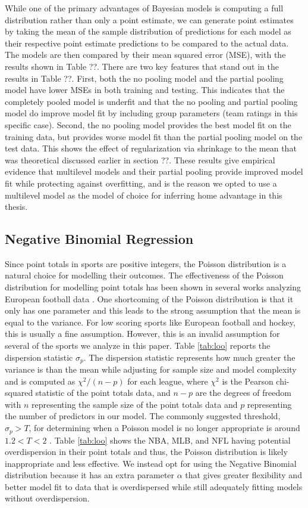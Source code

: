 While one of the primary advantages of Bayesian models is computing a full distribution rather than only a point estimate, we can generate point estimates by taking the mean of the sample distribution of predictions for each model as their respective point estimate predictions to be compared to the actual data. The models are then compared by their mean squared error (MSE), with the results shown in Table ??. There are two key features that stand out in the results in Table ??. First, both the no pooling model and the partial pooling model have lower MSEs in both training and testing. This indicates that the completely pooled model is underfit and that the no pooling and partial pooling model do improve model fit by including group parameters (team ratings in this specific case). Second, the no pooling model provides the best model fit on the training data, but provides worse model fit than the partial pooling model on the test data. This shows the effect of regularization via shrinkage to the mean that was theoretical discussed earlier in section ??. These results give empirical evidence that multilevel models and their partial pooling provide improved model fit while protecting against overfitting, and is the reason we opted to use a multilevel model as the model of choice for inferring home advantage in this thesis.

\subsection{Negative Binomial Regression}
Since point totals in sports are positive integers, the Poisson distribution is a natural choice for modelling their outcomes. The effectiveness of the Poisson distribution for modelling point totals has been shown in several works analyzing European football data \cite{Karlis2003} \cite{Baio2010} \cite{Benz2020}. One shortcoming of the Poisson distribution is that it only has one parameter and this leads to the strong assumption that the mean is equal to the variance. For low scoring sports like European football and hockey, this is usually a fine assumption. However, this is an invalid assumption for several of the sports we analyze in this paper. Table \ref{tab:loo} reports the dispersion statistic \(\sigma_p\). The dispersion statistic represents how much greater the variance is than the mean while adjusting for sample size and model complexity and is computed as  \(\chi^2/(n-p)\) for each league, where \(\chi^2\) is the Pearson chi-squared statistic of the point totals data, and \(n-p\) are the degrees of freedom with \(n\) representing the sample size of the point totals data and \(p\) representing the number of predictors in our model. The commonly suggested threshold, \(\sigma_p > T\), for determining when a Poisson model is no longer appropriate is around \(1.2 < T < 2\) \cite{Payne2018} \cite{Cameron1990}. Table \ref{tab:loo} shows the NBA, MLB, and NFL having potential overdispersion in their point totals and thus, the Poisson distribution is likely inappropriate and less effective. We instead opt for using the Negative Binomial distribution because it has an extra parameter \(\alpha\) that gives greater flexibility and better model fit to data that is overdispersed while still adequately fitting models without overdispersion.


